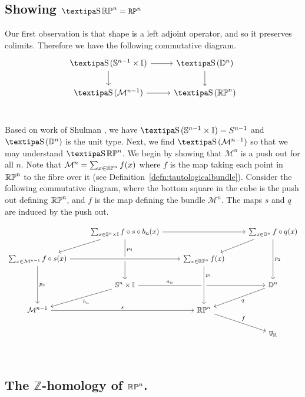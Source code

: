 \documentclass{amsart}
\begin{document}
\subsection{Showing $ \shape \set{RP}^n = \RP^n $}
Our first observation is that shape is a left adjoint operator, and so it preserves colimits. Therefore we have the following commutative diagram.
\[\begin{tikzcd}
\shape(\set{S}^{n-1} \times \set{I}) \arrow[r] \arrow[d] &\shape (\set{D}^{n}) \arrow[d]\\
\shape (\mathcal{M}^{n-1}) \arrow[r] &\shape (\set{RP}^n)\\
\end{tikzcd}
\] 

Based on work of Shulman \cite{shul:bfp}, we have $\shape(\set{S}^{n-1} \times \set{I}) =S^{n-1}$ and $\shape (\set{D}^{n})$ is the unit type. Next, we find $\shape (\mathcal{M}^{n-1})$ so that we may understand $ \shape \set{RP}^n$.  We begin by showing that $\mathcal{M}^{n}$ is a push out for all $n$. Note that $\mathcal{M}^n= \sum _{x \in \mathbb{RP}^n} f(x)$ where $f$ is the map taking each point in $\mathbb{RP}^n$ to the fibre over it (see Definition~\ref{defn:tautologicalbundle}). Consider the following commutative diagram, where the bottom square in the cube is the push out defining $\mathbb{RP}^n$, and $f$ is the map defining the bundle  $ \mathcal{M}^{n}$. The maps $s$ and $q$ are induced by the push out.

\[\begin{tikzcd}
																& \sum_{x \in \set{S}^n \times \set{I}} f \circ s \circ b_n (x) \arrow[rr]	\arrow[ld] \arrow[dd, near start, "p_4"] 	&									& \sum_{x \in \set{D}^n} f \circ q (x) \arrow[ld] \arrow[dd, "p_2"]\\
\sum_{x \in \mathcal{M}^{n-1}}  f \circ s (x) \arrow[rr, crossing over] \arrow[dd, "p_3"]	&																					& \sum_{x \in \set{RP}^n}f(x)				&	\\
																& \set{S}^n \times \set{I} \arrow[rr, near start, "a_n"] \arrow[ld, "b_n"]									&									& \set{D}^n \arrow [ld, "q"]\\
\mathcal{M}^{n-1} \arrow[rr, "s" ]										&																					& \set{RP}^n \ar[rd, "f"] 					& \\
																&																					&									& \U_{\set{R}}\\
\arrow[from=2-3, to=4-3, crossing over, near start, "p_1"]
\end{tikzcd}
\]

\subsection{The $\mathbb{Z}$-homology of $\mathbb{RP}^n$.}
\end{document}
